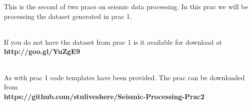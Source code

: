 

\maketitle %
This is the second of two pracs on seismic data processing.  In this prac we will be processing the dataset generated in prac 1.  
\par~\\
If you do not have the dataset from prac 1 is it available for download at \textbf{http://goo.gl/YuZgE9}
\par~\\
As with prac 1 code templates have been provided. The prac can be downloaded from  \\ \textbf{https://github.com/stuliveshere/Seismic-Processing-Prac2}

